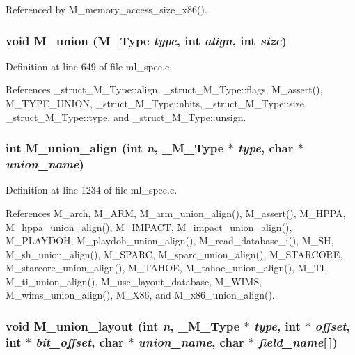 Referenced by M\_\-memory\_\-access\_\-size\_\-x86().
\subsubsection{\setlength{\rightskip}{0pt plus 5cm}void M\_\-union (\bf{M\_\-Type} {\em type}, int {\em align}, int {\em size})}\label{m__spec_8h_5a5989f679ee7ae2980b6580da234a1d}




Definition at line 649 of file ml\_\-spec.c.

References \_\-struct\_\-M\_\-Type::align, \_\-struct\_\-M\_\-Type::flags, M\_\-assert(), M\_\-TYPE\_\-UNION, \_\-struct\_\-M\_\-Type::nbits, \_\-struct\_\-M\_\-Type::size, \_\-struct\_\-M\_\-Type::type, and \_\-struct\_\-M\_\-Type::unsign.
\subsubsection{\setlength{\rightskip}{0pt plus 5cm}int M\_\-union\_\-align (int {\em n}, \bf{\_\-M\_\-Type} $\ast$ {\em type}, char $\ast$ {\em union\_\-name})}\label{m__spec_8h_29fb59ad7c2b4e258ec3053dbfd716e8}




Definition at line 1234 of file ml\_\-spec.c.

References M\_\-arch, M\_\-ARM, M\_\-arm\_\-union\_\-align(), M\_\-assert(), M\_\-HPPA, M\_\-hppa\_\-union\_\-align(), M\_\-IMPACT, M\_\-impact\_\-union\_\-align(), M\_\-PLAYDOH, M\_\-playdoh\_\-union\_\-align(), M\_\-read\_\-database\_\-i(), M\_\-SH, M\_\-sh\_\-union\_\-align(), M\_\-SPARC, M\_\-sparc\_\-union\_\-align(), M\_\-STARCORE, M\_\-starcore\_\-union\_\-align(), M\_\-TAHOE, M\_\-tahoe\_\-union\_\-align(), M\_\-TI, M\_\-ti\_\-union\_\-align(), M\_\-use\_\-layout\_\-database, M\_\-WIMS, M\_\-wims\_\-union\_\-align(), M\_\-X86, and M\_\-x86\_\-union\_\-align().
\subsubsection{\setlength{\rightskip}{0pt plus 5cm}void M\_\-union\_\-layout (int {\em n}, \bf{\_\-M\_\-Type} $\ast$ {\em type}, int $\ast$ {\em offset}, int $\ast$ {\em bit\_\-offset}, char $\ast$ {\em union\_\-name}, char $\ast$ {\em field\_\-name}[$\,$])}\label{m__spec_8h_f481657f2f39a167022d6db00bb5a5f5}




